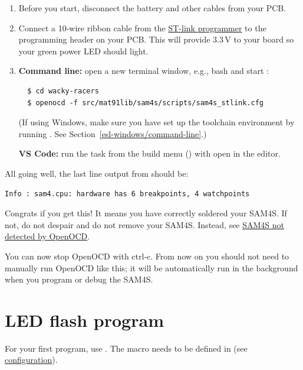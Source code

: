 \begin{enumerate}
\item
  Before you start, disconnect the battery and other cables from your
  PCB.

\item
  Connect a 10-wire ribbon cable from the \hyperref[ST-link]{ST-link
    programmer} to the programming header on your PCB.  This will
  provide 3.3\,V to your board so your green power LED should light.

\item
  \textbf{Command line:} open a new terminal window, e.g., bash and
  start :
  \begin{verbatim}
  $ cd wacky-racers
  $ openocd -f src/mat91lib/sam4s/scripts/sam4s_stlink.cfg
  \end{verbatim}
  (If using Windows, make sure you have set up the toolchain environment
  by running
  . See
  Section~\ref{esl-windows/command-line}.)

  \textbf{VS Code:} run the  task from the
  build menu () with
   open in the editor.
\end{enumerate}

All going well, the last line output from  should be:
\begin{verbatim}
Info : sam4.cpu: hardware has 6 breakpoints, 4 watchpoints
\end{verbatim}

Congrats if you get this! It means you have correctly soldered your
SAM4S. If not, do not despair and do not remove your SAM4S. Instead,
see \protect\hyperref[sam4s-not-detected-by-openocd]{SAM4S not
  detected by OpenOCD}.

You can now stop OpenOCD with ctrl-c.  From now on you should not need
to manually run OpenOCD like this; it will be automatically run in the
background when you program or debug the SAM4S.


\section{LED flash program}
\label{led-flash-program}

For your first program, use
. The macro 
needs to be defined in  (see
\protect\hyperref[configuration]{configuration}).

